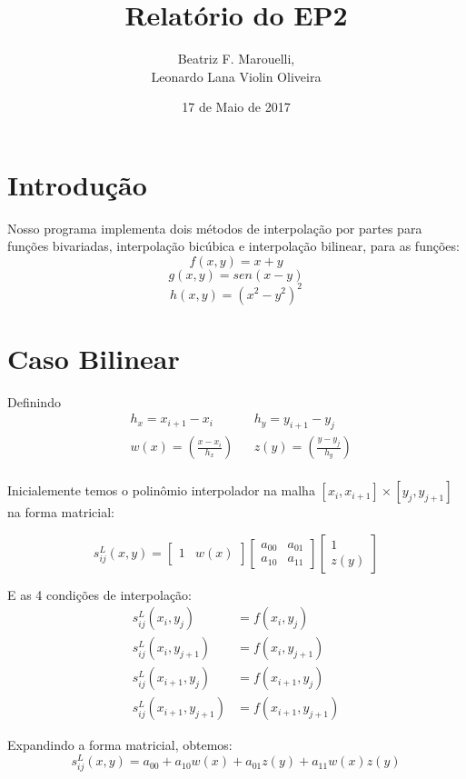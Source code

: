 \documentclass[a4paper, 12pt]{article}
\title{Relatório do EP2}
\author{Beatriz F. Marouelli, \\Leonardo Lana Violin Oliveira}
\date{17 de Maio de 2017}
\begin{document}
\maketitle

\section*{Introdução}
Nosso programa implementa dois métodos de interpolação por partes para funções bivariadas, interpolação bicúbica e interpolação bilinear, para as funções:
$$f(x, y) = x + y$$ 
$$g(x, y) = sen(x - y)$$
$$h(x, y) = (x^2 - y^2)^2$$

\section*{Caso Bilinear}
Definindo 
\begin{align*}
    &h_x = x_{i+1} - x_i &&h_y = y_{i+1} - y_j\\
    &w(x) =\left(\frac{x - x_i}{h_x}\right) &&z(y) = \left(\frac{y - y_j}{h_y}\right)\\
\end{align*}

Inicialemente temos o polinômio interpolador na malha 
$[x_i, x_{i + 1}] \times [y_j, y_{j + 1}]$ na forma matricial:

\[
    s_{ij}^L(x,y) =
\begin{bmatrix}
    1 & w(x) 
\end{bmatrix}
\begin{bmatrix}
    a_{00} & a_{01} \\
    a_{10} & a_{11}
\end{bmatrix}
\begin{bmatrix}
    1 \\
    z(y)
\end{bmatrix}
\]

E as 4 condições de interpolação:
\begin{align}
    s_{ij}^L(x_i,y_j) &= f(x_i, y_j) \tag{1}\\
    s_{ij}^L(x_i,y_{j + 1}) &= f(x_i, y_{j + 1}) \tag{2} \\
    s_{ij}^L(x_{i + 1},y_j) &= f(x_{i + 1}, y_j) \tag{3} \\
    s_{ij}^L(x_{i + 1},y_{j + 1}) &= f(x_{i + 1}, y_{j + 1}) \tag{4}
\end{align}

Expandindo a forma matricial, obtemos:
$$s_{ij}^L(x,y) = a_{00} + a_{10}w(x) + a_{01}z(y) + a_{11}w(x)z(y)$$
\end{document}
